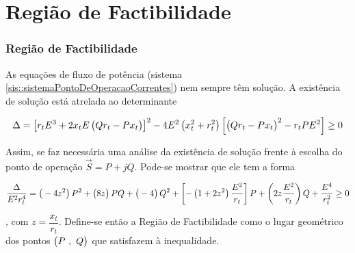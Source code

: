 \documentclass[10pt, compress,xcolor={svgnames,dvipsnames,x11names}]{beamer}
\begin{document}
\section{Região de Factibilidade} %
\begin{frame}%
\frametitle{Região de Factibilidade}
\scriptsize

	As equações de fluxo de potência (sistema \ref{sis::sistemaPontoDeOperacaoCorrentes}) nem sempre têm solução. A existência de solução está atrelada ao determinante

\begin{gather}
\Delta = \left[ r_tE^3 + 2x_tE\left(\strut Qr_t - Px_t \right)\right]^2 - 4E^2\left(\strut x_t^2 + r_t^2\right)\left[\left(\strut Qr_t - Px_t \right) ^2 -r_tPE^2\right] \geq 0 \nonumber
\end{gather}

	Assim, se faz necessária uma análise da existência de solução frente à escolha do ponto de operação $\vec{S} = P + jQ$. Pode-se mostrar que ele tem a forma

\begin{gather}
\dfrac{\Delta}{E^2r_t^4} = \left(\strut - 4z^2 \right)P^2 + \left(\strut 8z \right) PQ + \left(\strut -4 \right) Q^2 + \left[ - \left( 1+2z^2\right)\dfrac{E^2}{r_t} \right] P + \left(\strut 2z\dfrac{E^2}{r_t} \right) Q + \dfrac{E^4}{r_t^2} \geq 0 \label{eq::regiaoDeFactibilidadePQ}
\end{gather}

	, com $z = \dfrac{x_t}{r_t}$. Define-se então a \alert{Região de Factibilidade} como o lugar geométrico dos pontos $\left(\strut P\ ,\ Q\right)$ que satisfazem à inequalidade.

\normalsize
\end{frame}%
\end{document}
